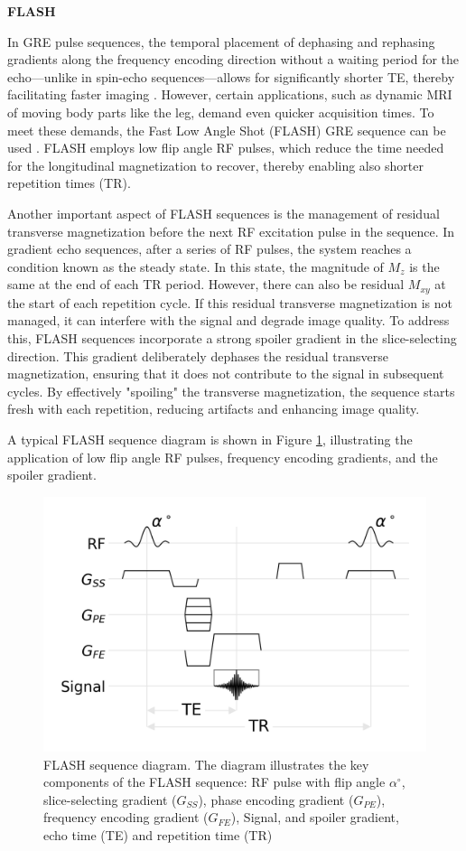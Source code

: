 \documentclass{micro-econ-thesis}
\begin{document}
\textbf{FLASH}

In GRE pulse sequences, the temporal placement of dephasing and rephasing gradients along the frequency encoding direction without a waiting period for the echo—unlike in spin-echo sequences—allows for significantly shorter TE, thereby facilitating faster imaging  \parencite[p.94]{westbrook_mri_2019}. However, certain applications, such as dynamic MRI of moving body parts like the leg, demand even quicker acquisition times. To meet these demands, the Fast Low Angle Shot (FLASH) GRE sequence can be used \parencite{haase_flash_1986}. FLASH employs low flip angle RF pulses, which reduce the time needed for the longitudinal magnetization to recover, thereby enabling also shorter repetition times (TR). 

Another important aspect of FLASH sequences is the management of residual transverse magnetization before the next RF excitation pulse in the sequence. In gradient echo sequences, after a series of RF pulses, the system reaches a condition known as the steady state. In this state, the magnitude of $M_z$ is the same at the end of each TR period. However, there can also be residual $M_{xy}$ at the start of each repetition cycle. If this residual transverse magnetization is not managed, it can interfere with the signal and degrade image quality. To address this, FLASH sequences incorporate a strong spoiler gradient in the slice-selecting direction. This gradient deliberately dephases the residual transverse magnetization, ensuring that it does not contribute to the signal in subsequent cycles. By effectively "spoiling" the transverse magnetization, the sequence starts fresh with each repetition, reducing artifacts and enhancing image quality.

A typical FLASH sequence diagram is shown in Figure \ref{fig:gresimplified}, illustrating the application of low flip angle RF pulses, frequency encoding gradients, and the spoiler gradient.

\begin{figure}[H]
	\centering
	\includegraphics[width=0.7\linewidth]{flash_seq}
	\caption{FLASH sequence diagram. The diagram illustrates the key components of the FLASH sequence: RF pulse with flip angle $\alpha^\circ$, slice-selecting gradient ($G_{SS}$), phase encoding gradient ($G_{PE}$), frequency encoding gradient ($G_{FE}$), Signal, and spoiler gradient, echo time (TE) and repetition time (TR)}
	\label{fig:gresimplified}
\end{figure}
\end{document}
